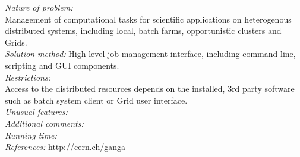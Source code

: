 \documentclass{elsart}
\begin{document}
{{\em Nature of problem:}\\
Management of computational tasks for scientific applications 
on heterogenous distributed systems, including local, 
batch farms, opportunistic clusters and Grids.  %
   \\
{\em Solution method:}
High-level job management interface, including command line, 
scripting and GUI components.
\\
{\em Restrictions:}\\
Access to the distributed resources depends on the installed, 
3rd party software such as  batch system client or 
Grid user interface.
   \\
{\em Unusual features:}\\
{\em Additional comments:}\\
{\em Running time:}\\
{\em References:} http://cern.ch/ganga 

}
\end{document}
